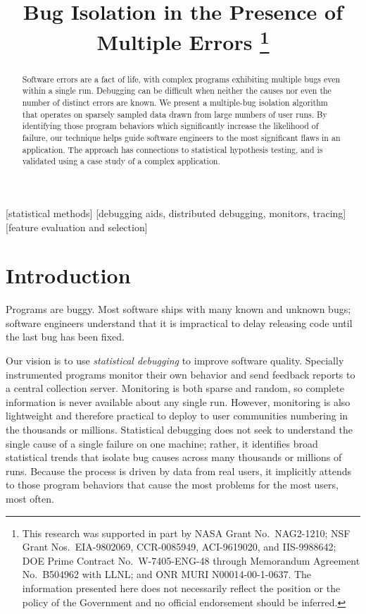 \documentclass[draft]{sig-alternate}
\title{Bug Isolation in the Presence of Multiple Errors
  \thanks{This research was supported in part by NASA Grant No.\
    NAG2-1210; NSF Grant Nos.\ EIA-9802069, CCR-0085949, ACI-9619020,
    and IIS-9988642; DOE Prime Contract No.\ W-7405-ENG-48 through
    Memorandum Agreement No.\ B504962 with LLNL; and ONR MURI
    N00014-00-1-0637.  The information
    presented here does not necessarily reflect the position or the
    policy of the Government and no official endorsement should be
    inferred.}}
\author{
  \alignauthor Ben Liblit \eecs \\
  \alignauthor Mayur Naik \stan \\
  \alignauthor Alice X.\ Zheng \eecs \\
  \moreauthors
  \global\multiply\auwidth by 3
  \global\divide\auwidth by 2
  \alignauthor Alex Aiken \stan \\
  \alignauthor Michael I.\ Jordan \both
  \moreauthors
  \alignauthor
  \affaddr{\eecs Department of Electrical \\ Engineering and Computer Science} \\
  \affaddr{\stat Department of Statistics} \\
  \affaddr{University of California, Berkeley} \\
  \affaddr{Berkeley, CA 94720-1776}
  \alignauthor
  \affaddr{\stan Computer Science Department} \\
  \affaddr{353 Serra Mall} \\
  \affaddr{Stanford University} \\
  \affaddr{Stanford CA 94305-9025}
}
\newcommand{\termdef}[1]{\textit{#1}}
\begin{document}
\CopyrightYear{2004}
\maketitle

\begin{abstract}
  Software errors are a fact of life, with complex programs exhibiting
  multiple bugs even within a single run.  Debugging can be difficult
  when neither the causes nor even the number of distinct errors are
  known.  We present a multiple-bug isolation algorithm that operates
  on sparsely sampled data drawn from large numbers of user runs.  By
  identifying those program behaviors which significantly increase the
  likelihood of failure, our technique helps guide software engineers
  to the most significant flaws in an application.  The approach has
  connections to statistical hypothesis testing, and is validated
  using a case study of a complex application.
\end{abstract}

[statistical methods]
[debugging aids, distributed debugging, monitors, tracing]
[feature
  evaluation and selection]




\section{Introduction}
\label{sec:introduction}

Programs are buggy.
Most software ships with many known and unknown bugs; software
engineers understand that it is impractical to delay releasing code
until the last bug has been fixed.

Our vision is to use \termdef{statistical debugging} to
improve software quality.  Specially
instrumented programs monitor their own behavior and send feedback
reports to a central collection server.  Monitoring is both sparse and
random, so complete information is never available about
any single run.  However, monitoring is also lightweight and therefore
practical to deploy to user communities numbering in the thousands or
millions.  Statistical debugging does not seek to understand the
single cause of a single failure on one machine; rather, it identifies
broad statistical trends that isolate bug causes across many thousands
or millions of runs.  Because the process is driven by data from real
users, it implicitly attends to those program behaviors that cause the
most problems for the most users, most often.
\end{document}
